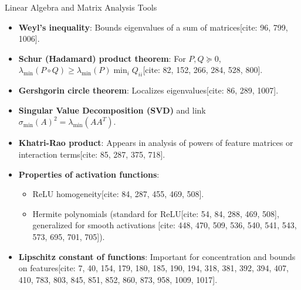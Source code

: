 \documentclass{beamer}
\theoremstyle{definition}
\theoremstyle{remark}
\newcommand{\lambdaMin}{\lambda_{\min}}
\newcommand{\sigmaMin}{\sigma_{\min}}
\begin{document}
\begin{frame}{Linear Algebra and Matrix Analysis Tools}
  \justify
  \begin{itemize}
    \item \textbf{Weyl's inequality}: Bounds eigenvalues of a sum of matrices[cite: 96, 799, 1006].
    \item \textbf{Schur (Hadamard) product theorem}: For $P, Q \succeq 0$, $\lambdaMin(P \circ Q) \ge \lambdaMin(P) \min_i Q_{ii}$[cite: 82, 152, 266, 284, 528, 800].
    \item \textbf{Gershgorin circle theorem}: Localizes eigenvalues[cite: 86, 289, 1007].
    \item \textbf{Singular Value Decomposition (SVD)} and link $\sigmaMin(A)^2 = \lambdaMin(AA^T)$.
    \item \textbf{Khatri-Rao product}: Appears in analysis of powers of feature matrices or interaction terms[cite: 85, 287, 375, 718].
    \item \textbf{Properties of activation functions}:
    \begin{itemize}
      \item ReLU homogeneity[cite: 84, 287, 455, 469, 508].
      \item Hermite polynomials (standard for ReLU[cite: 54, 84, 288, 469, 508], generalized for smooth activations [cite: 448, 470, 509, 536, 540, 541, 543, 573, 695, 701, 705]).
    \end{itemize}
    \item \textbf{Lipschitz constant of functions}: Important for concentration and bounds on features[cite: 7, 40, 154, 179, 180, 185, 190, 194, 318, 381, 392, 394, 407, 410, 783, 803, 845, 851, 852, 860, 873, 958, 1009, 1017].
  \end{itemize}
\end{frame}

\end{document}
